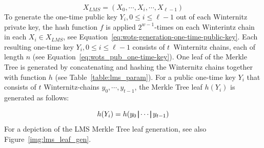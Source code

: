 \begin{equation}
X_{LMS} = (X_0, \cdots, X_i, \cdots, X_{\ell-1})
\end{equation} 
To generate the one-time public key $Y_i, 0 \leq i \leq \ell-1$ out of each Winternitz private key, the hash function $f$ is applied $2^{w-1}$-times on each Winterintz chain in each $X_i \in X_{LMS}$, see Equation~\ref{eq:wots-generation-one-time-public-key}.
Each resulting one-time key $Y_i, 0 \leq i \leq \ell-1$ consists of $t$~Winternitz chains, each of length $n$ (see Equation~\ref{eq:wots_pub_one-time-key}). One leaf of the Merkle Tree is generated by concatenating and hashing the Winternitz chains together with function $h$ (see Table~\ref{table:lms_param}). For a public one-time key $Y_i$ that consists of $t$ Winternitz-chains $y_0, \cdots, y_{t-1}$, the Merkle Tree leaf $h(Y_i)$ is generated as follows:

\begin{equation}
h(Y_i) = h(y_0 \operatorname{|\!\!|} \cdots \operatorname{|\!\!|} y_{t-1})
\end{equation}
For a depiction of the LMS Merkle Tree leaf generation, see also Figure~\ref{img:lms_leaf_gen}.

